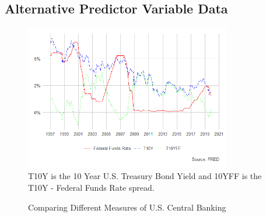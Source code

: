 \documentclass[12pt]{article}
\begin{document}
\subsection{Alternative Predictor Variable Data}
\begin{figure}[!h]
\caption{Comparing Different Measures of U.S. Central Banking}
\centering
\includegraphics[width=0.8\textwidth]{mpmeasure.png}\\
T10Y is the 10 Year U.S. Treasury Bond Yield and 10YFF is the T10Y - Federal Funds Rate spread.
\label{fig:mpmeasure}
\end{figure}
\newpage
\end{document}

